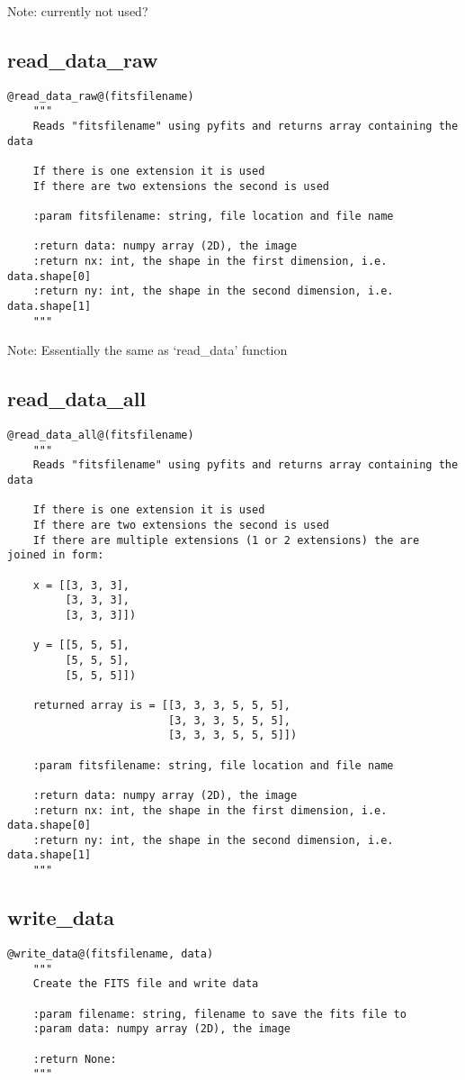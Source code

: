 \noindent Note: currently not used?

\subsection{read\_data\_raw}
\begin{lstlisting}[style=pythonstyle]
@read_data_raw@(fitsfilename)
    """
    Reads "fitsfilename" using pyfits and returns array containing the data

    If there is one extension it is used
    If there are two extensions the second is used

    :param fitsfilename: string, file location and file name

    :return data: numpy array (2D), the image
    :return nx: int, the shape in the first dimension, i.e. data.shape[0]
    :return ny: int, the shape in the second dimension, i.e. data.shape[1]
    """
\end{lstlisting}

\noindent Note: Essentially the same as `read\_data' function

\subsection{read\_data\_all}
\begin{lstlisting}[style=pythonstyle]
@read_data_all@(fitsfilename)
    """
    Reads "fitsfilename" using pyfits and returns array containing the data

    If there is one extension it is used
    If there are two extensions the second is used
    If there are multiple extensions (1 or 2 extensions) the are joined in form:

    x = [[3, 3, 3],
         [3, 3, 3],
         [3, 3, 3]])

    y = [[5, 5, 5],
         [5, 5, 5],
         [5, 5, 5]])

    returned array is = [[3, 3, 3, 5, 5, 5],
                         [3, 3, 3, 5, 5, 5],
                         [3, 3, 3, 5, 5, 5]])

    :param fitsfilename: string, file location and file name

    :return data: numpy array (2D), the image
    :return nx: int, the shape in the first dimension, i.e. data.shape[0]
    :return ny: int, the shape in the second dimension, i.e. data.shape[1]
    """

\end{lstlisting}

\subsection{write\_data}
\begin{lstlisting}[style=pythonstyle]
@write_data@(fitsfilename, data)
    """
    Create the FITS file and write data

    :param filename: string, filename to save the fits file to
    :param data: numpy array (2D), the image

    :return None:
    """
\end{lstlisting}

